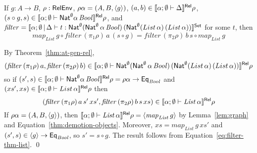 \documentclass{lmcs}
\theoremstyle{plain}\newtheorem{satz}[thm]{Satz}
\newcommand{\filtype}{\Nat^\emptyset 
 (\Nat^\emptyset \, \alpha \, \mathit{Bool})\, (\Nat^\emptyset 
  (List \, \alpha) \, (List \, \alpha))}
\begin{document}
\begin{thm} 
If $g : A \to B$, $\rho : \mathsf{RelEnv}$, $\rho \alpha = (A, B, \langle {g} \rangle)$,
$(a, b) \in \llbracket{\alpha ;\emptyset \vdash \Delta}\rrbracket^{\mathsf{Rel}} \rho$, $(s \circ
g, s) \in \llbracket{\alpha; \emptyset \vdash \mathsf{Nat}^\emptyset \alpha \,
  \mathit{Bool}}\rrbracket^{\mathsf{Rel}} \rho$, and %
$\mathit{filter} = \setsem{\alpha; \emptyset \,|\, \Delta \vdash t :
  \filtype}$ for some $t$, then
\[  \mathit{map}_{\mathit{List}} \,g \circ \mathit{filter} \, (\pi_1
\rho) \, a \, (s \circ g) = \mathit{filter}\, (\pi_2\rho) \, b \, s
\circ \mathit{map}_{\mathit{List}} \,g\]
\end{thm}
\proof
By Theorem~\ref{thm:at-gen-rel}, \[(\mathit{filter}\, (\pi_1 \rho)\, a,
\mathit{filter}\, (\pi_2 \rho)\, b) \in \relsem{\alpha; \emptyset
  \vdash \filtype} \rho\] so if $(s', s) \in \llbracket{\alpha; \emptyset
  \vdash \mathsf{Nat}^\emptyset \alpha \, \mathit{Bool}}\rrbracket^{\mathsf{Rel}} \rho = \rho\alpha \to
\mathsf{Eq}_{\mathit{Bool}}$ and $(xs', xs) \in \llbracket{\alpha; \emptyset
  \vdash List \, \alpha}\rrbracket^{\mathsf{Rel}} \rho$ then
\begin{equation}\label{eq:filter-thm-list}
  (\mathit{filter}\, (\pi_1\rho) \,a \,s' \,xs', \mathit{filter} \,
  (\pi_2\rho) \,b \,s \,xs) \in \llbracket{\alpha; \emptyset \vdash
    \mathit{List} \, \alpha}\rrbracket^{\mathsf{Rel}} \rho
\end{equation}
If $\rho\alpha = (A, B, \langle {g} \rangle)$, then $\llbracket{\alpha; \emptyset
  \vdash \mathit{List} \, \alpha}\rrbracket^{\mathsf{Rel}} \rho =
\langle {\mathit{map}_{\mathit{List}} \, g} \rangle$ by Lemma~\ref{lem:graph}
and Equation~\ref{thm:demotion-objects}.  Moreover, $xs =
\mathit{map}_{\mathit{List}} \,g \,xs'$ and $(s', s) \in \langle {g} \rangle \to
\mathsf{Eq}_{\mathit{Bool}}$, so $s' = s \circ g$. The result
follows from %
Equation~\ref{eq:filter-thm-list}.
\qed
\end{document}

